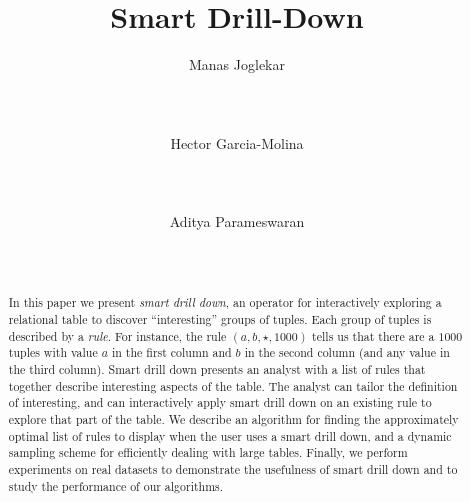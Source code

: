 \documentclass{vldb}
\newcommand{\techreporttext}[1]{}
\begin{document}
\title{Smart Drill-Down}
\author{
\alignauthor
Manas Joglekar\\
       \\
       \\
	   \\
\alignauthor
Hector Garcia-Molina\\
       \\
       \\
	   \\
\alignauthor 
Aditya Parameswaran\\
       \\
       \\
}
\maketitle

\begin{abstract}
In this paper we present {\em smart drill down},
an operator for interactively exploring a relational table
to discover ``interesting'' groups of tuples.
Each group of tuples is described by a {\em rule}.
For instance, the rule $(a, b, \star, 1000)$ tells us that
there are a $1000$ tuples with value $a$ in the first column and $b$
in the second column (and any value in the third column).
Smart drill down presents an analyst with a list of rules that
together describe interesting aspects of the table.
The analyst can tailor the definition of interesting,
and can interactively apply smart drill down on an existing rule to
explore that part of the table.
We describe an
algorithm for finding the approximately optimal list of rules to display when the user uses a smart drill down, and a dynamic sampling scheme for efficiently dealing with large tables. Finally, we
perform experiments on real datasets to demonstrate the usefulness of smart drill down and to study the performance of our algorithms.
\end{abstract}









\techreporttext{}






  


\techreporttext{}
\end{document}
